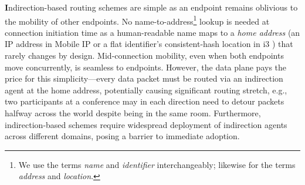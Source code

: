 {\begin{table*}[t]
{\begin{tabular}{|p{0.98in}|p{1.4in}|p{2.2in}|p{1.7in}|}
 \hline
\end{tabular}
}
\vspace{-0.15in}
\caption{Classification of many alternative naming and routing architectures (not necessarily designed with mobility in mind) based on how they (might) handle mobility.}
\vspace{-0.1in}
\label{tab:arch}
\end{table*}

}

\newcommand{\indirection}{indirection-based routing}
\newcommand{\Indirection}{Indirection-based routing}
\newcommand{\Logcen}{Global name-to-address resolution}
\newcommand{\logcen}{global name-to-address resolution}
\newcommand{\namerouting}{name-based routing}
\newcommand{\Namerouting}{Name-based routing}

{\textbf \Indirection} schemes are simple as an endpoint remains oblivious to the mobility of other endpoints. No name-to-address\footnote{We use the terms {\em name} and {\em identifier} interchangeably; likewise for the terms {\em address} and {\em location}.} lookup is needed at connection initiation time as a human-readable name maps to a {\em home address} (an IP address in Mobile IP \cite{MIP} or a flat identifier's consistent-hash location in i3 \cite{i3}) that rarely changes by design. Mid-connection mobility, even when both endpoints move concurrently, is seamless to endpoints. However, the data plane pays the price for this simplicity---every data packet must be routed via an indirection agent at the home address, potentially causing significant routing stretch, e.g., two participants at a conference may in each direction need to detour packets halfway across the world despite being in the same  room. %
Furthermore, indirection-based schemes require widespread deployment of indirection agents across different domains, posing a barrier to immediate adoption.


